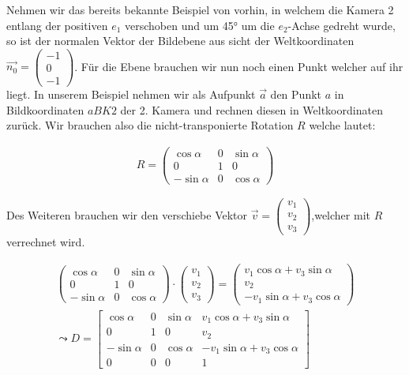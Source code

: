 Nehmen wir das bereits bekannte Beispiel von vorhin, in welchem die Kamera 2 entlang der positiven \ensuremath{e_1} verschoben und um 45° um die \ensuremath{e_2}-Achse gedreht wurde, so ist der normalen Vektor der Bildebene aus sicht der Weltkoordinaten \ensuremath{\vec{n_0} = \begin{pmatrix}
		-1\\0\\-1
\end{pmatrix}}. Für die Ebene brauchen wir nun noch einen Punkt welcher auf ihr liegt. In unserem Beispiel nehmen wir als Aufpunkt \ensuremath{\vec{a}} den Punkt \ensuremath{a} in Bildkoordinaten \ensuremath{aBK2} der 2. Kamera und rechnen diesen in Weltkoordinaten zurück. Wir brauchen also die nicht-transponierte Rotation \ensuremath{R} welche lautet:

\begin{gather}
R=\begin{pmatrix}
\cos{\alpha}&0&\sin{\alpha}\\
0&1&0\\
-\sin{\alpha}&0&\cos{\alpha}
\end{pmatrix}
\end{gather}

Des Weiteren brauchen wir den verschiebe Vektor \ensuremath{\vec{v} = \begin{pmatrix}
		v_1\\v_2\\v_3
\end{pmatrix}},welcher mit \ensuremath{R} verrechnet wird.


\begin{gather}
\begin{pmatrix}
\cos{\alpha}&0&\sin{\alpha}\\
0&1&0\\
-\sin{\alpha}&0&\cos{\alpha}
\end{pmatrix}
\cdot
\begin{pmatrix}
v_1\\v_2\\v_3
\end{pmatrix}
=
\begin{pmatrix}
v_1\cos{\alpha}+v_3\sin{\alpha}\\
v_2\\
-v_1\sin{\alpha}+v_3\cos{\alpha}
\end{pmatrix}\\
\leadsto D =
\begin{bmatrix}
\cos{\alpha}&0&\sin{\alpha}&v_1\cos{\alpha}+v_3\sin{\alpha}\\
0&1&0&v_2\\
-\sin{\alpha}&0&\cos{\alpha}&-v_1\sin{\alpha}+v_3\cos{\alpha}\\
0&0&0&1
\end{bmatrix}
\end{gather}\\


